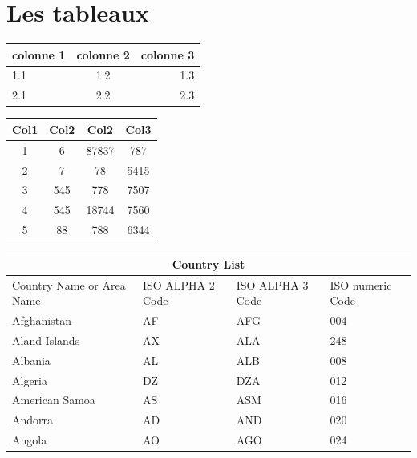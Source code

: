 \documentclass{rapportHenallux}
\begin{document}
\section{Les tableaux}
\begin{tabular}{|l|c|r|}
  \hline
  colonne 1 & colonne 2 & colonne 3 \\
  \hline
  1.1 & 1.2 & 1.3 \\
  2.1 & 2.2 & 2.3 \\
  \hline
\end{tabular}

\begin{center}
\begin{tabular}{||c c c c||} 
 \hline
 Col1 & Col2 & Col2 & Col3 \\ [0.5ex] 
 \hline\hline
 1 & 6 & 87837 & 787 \\ 
 \hline
 2 & 7 & 78 & 5415 \\
 \hline
 3 & 545 & 778 & 7507 \\
 \hline
 4 & 545 & 18744 & 7560 \\
 \hline
 5 & 88 & 788 & 6344 \\ [1ex] 
 \hline
\end{tabular}
\end{center}

\begin{tabular}{ |p{3cm}||p{3cm}|p{3cm}|p{3cm}|  }
 \hline
 \multicolumn{4}{|c|}{Country List} \\
 \hline
 Country Name or Area Name& ISO ALPHA 2 Code &ISO ALPHA 3 Code&ISO numeric Code\\
 \hline
 Afghanistan   & AF    &AFG&   004\\
 Aland Islands&   AX  & ALA   &248\\
 Albania &AL & ALB&  008\\
 Algeria    &DZ & DZA&  012\\
 American Samoa&   AS  & ASM&016\\
 Andorra& AD  & AND   &020\\
 Angola& AO  & AGO&024\\
 \hline
\end{tabular}
\end{document}
